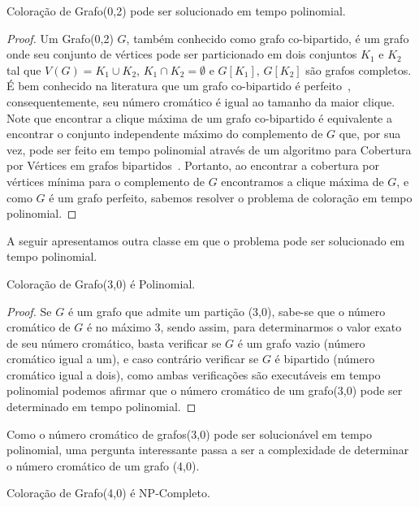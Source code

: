 	\begin{teorema}
		Coloração de Grafo(0,2) pode ser solucionado em tempo polinomial.
	\end{teorema}
	\begin{proof}
		Um Grafo(0,2) $G$, também conhecido como grafo co-bipartido, é um grafo onde seu conjunto de vértices pode ser particionado em dois conjuntos $K_1$ e $K_2$ tal que $V(G)=K_1\cup K_2$, $K_1\cap K_2=\emptyset$ e $G[K_1]$, $G[K_2]$ são grafos completos.
É bem conhecido na literatura que um grafo co-bipartido é perfeito~\cite{bollo98}, consequentemente, seu número cromático é igual ao tamanho da maior clique. Note que encontrar a clique máxima de um grafo co-bipartido é equivalente a encontrar o conjunto independente máximo do complemento de $G$ que, por sua vez, pode ser feito em tempo polinomial através de um algoritmo para Cobertura por Vértices em grafos bipartidos~\cite{konig31,zing12}. Portanto, ao encontrar a cobertura por vértices mínima para o complemento de $G$ encontramos a clique máxima de $G$, e como $G$ é um grafo perfeito, sabemos resolver o problema de coloração em tempo polinomial.
	\end{proof}
	
A seguir apresentamos outra classe em que o problema pode ser solucionado em tempo polinomial.	

\begin{teorema}
Coloração de Grafo(3,0) é Polinomial.
\end{teorema}

\begin{proof}
Se $G$ é um grafo que admite um partição (3,0), sabe-se que o número cromático de $G$ é no máximo 3, sendo assim, para determinarmos o valor exato de seu número cromático, basta verificar se $G$ é um grafo vazio (número cromático igual a um), e caso contrário verificar se $G$ é bipartido (número cromático igual a dois), como ambas verificações são executáveis em tempo polinomial podemos afirmar que o número cromático de um grafo(3,0) pode ser determinado em tempo polinomial.
	\end{proof}
	
Como o número cromático de grafos(3,0) pode ser solucionável em tempo polinomial, uma pergunta interessante passa a ser a complexidade de determinar o número cromático de um grafo (4,0).	
	

\begin{teorema}
	Coloração de Grafo(4,0) é NP-Completo.
\end{teorema}
	
